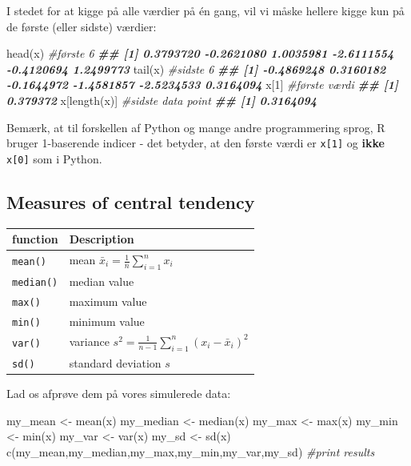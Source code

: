 \documentclass[
]{book}
\newenvironment{Shaded}{\begin{snugshade}}{\end{snugshade}}
\newcommand{\CommentTok}[1]{\textcolor[rgb]{0.56,0.35,0.01}{\textit{#1}}}
\newcommand{\DecValTok}[1]{\textcolor[rgb]{0.00,0.00,0.81}{#1}}
\newcommand{\DocumentationTok}[1]{\textcolor[rgb]{0.56,0.35,0.01}{\textbf{\textit{#1}}}}
\newcommand{\FunctionTok}[1]{\textcolor[rgb]{0.00,0.00,0.00}{#1}}
\newcommand{\NormalTok}[1]{#1}
\newcommand{\OtherTok}[1]{\textcolor[rgb]{0.56,0.35,0.01}{#1}}
\begin{document}
I stedet for at kigge på alle værdier på én gang, vil vi måske hellere kigge kun på de første (eller sidste) værdier:

\begin{Shaded}
\begin{Highlighting}[]
\FunctionTok{head}\NormalTok{(x) }\CommentTok{\#første 6}
\DocumentationTok{\#\# [1]  0.3793720 {-}0.2621080  1.0035981 {-}2.6111554 {-}0.4120694  1.2499773}
\FunctionTok{tail}\NormalTok{(x) }\CommentTok{\#sidste 6}
\DocumentationTok{\#\# [1] {-}0.4869248  0.3160182 {-}0.1644972 {-}1.4581857 {-}2.5234533  0.3164094}
\NormalTok{x[}\DecValTok{1}\NormalTok{] }\CommentTok{\#første værdi}
\DocumentationTok{\#\# [1] 0.379372}
\NormalTok{x[}\FunctionTok{length}\NormalTok{(x)] }\CommentTok{\#sidste data point}
\DocumentationTok{\#\# [1] 0.3164094}
\end{Highlighting}
\end{Shaded}

Bemærk, at til forskellen af Python og mange andre programmering sprog, R bruger 1-baserende indicer - det betyder, at den første værdi er \texttt{x{[}1{]}} og \textbf{ikke} \texttt{x{[}0{]}} som i Python.

\hypertarget{measures-of-central-tendency}{%
\subsection{Measures of central tendency}\label{measures-of-central-tendency}}

\begin{longtable}[]{@{}ll@{}}
\toprule
function & Description \\
\midrule
\endhead
\texttt{mean()} & mean \(\bar{x}_{i} = \frac{1}{n}\sum_{i=1}^{n} x_{i}\) \\
\texttt{median()} & median value \\
\texttt{max()} & maximum value \\
\texttt{min()} & minimum value \\
\texttt{var()} & variance \(s^2 = \frac{1}{n-1}\sum_{i=1}^{n} (x_{i} - \bar{x}_{i})^2\) \\
\texttt{sd()} & standard deviation \(s\) \\
\bottomrule
\end{longtable}

Lad os afprøve dem på vores simulerede data:

\begin{Shaded}
\begin{Highlighting}[]
\NormalTok{my\_mean }\OtherTok{\textless{}{-}} \FunctionTok{mean}\NormalTok{(x)}
\NormalTok{my\_median }\OtherTok{\textless{}{-}} \FunctionTok{median}\NormalTok{(x)}
\NormalTok{my\_max }\OtherTok{\textless{}{-}} \FunctionTok{max}\NormalTok{(x)}
\NormalTok{my\_min }\OtherTok{\textless{}{-}} \FunctionTok{min}\NormalTok{(x)}
\NormalTok{my\_var }\OtherTok{\textless{}{-}} \FunctionTok{var}\NormalTok{(x)}
\NormalTok{my\_sd }\OtherTok{\textless{}{-}} \FunctionTok{sd}\NormalTok{(x)}
\FunctionTok{c}\NormalTok{(my\_mean,my\_median,my\_max,my\_min,my\_var,my\_sd) }\CommentTok{\#print results}
\end{Highlighting}
\end{Shaded}
\end{document}
